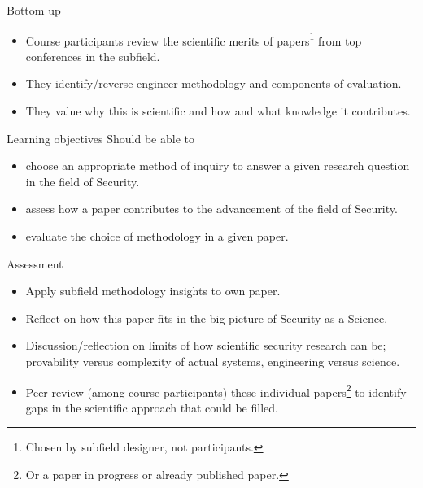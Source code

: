\begin{frame}
  \begin{block}{Bottom up}
    \begin{itemize}
      \item Course participants review the scientific merits of 
        papers\footnote{%
          Chosen by subfield designer, not participants.
        } from top conferences in the subfield.

      \item They identify/reverse engineer methodology and components of 
        evaluation.

      \item They value why this is scientific and how and what knowledge it 
        contributes.
    \end{itemize}
  \end{block}
\end{frame}

\begin{frame}
  \begin{block}{Learning objectives}
    Should be able to
    \begin{itemize}
      \item choose an appropriate method of inquiry to answer a given research 
        question in the field of Security.

      \item assess how a paper contributes to the advancement of the field of 
        Security.

      \item evaluate the choice of methodology in a given paper.
    \end{itemize}
  \end{block}
\end{frame}

\begin{frame}[allowframebreaks]
  \begin{block}{Assessment}
    \begin{itemize}
      \item Apply subfield methodology insights to own paper.

      \item Reflect on how this paper fits in the big picture of Security as a 
        Science.

      \item Discussion/reflection on limits of how scientific security research 
        can be; \eg provability versus complexity of actual systems, 
        engineering versus science.

      \item Peer-review (among course participants) these individual 
        papers\footnote{%
          Or a paper in progress or already published paper.
        } to identify gaps in the scientific approach that could be filled.
    \end{itemize}
  \end{block}
\end{frame}

